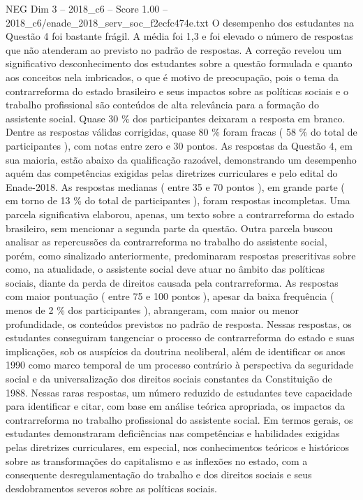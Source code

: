 \begin{textsample}{NEG Dim 3 – 2018\_c6 – Score 1.00 – 2018\_c6/enade\_2018\_serv\_soc\_f2ecfc474e.txt}
O desempenho dos estudantes na Questão 4 foi bastante frágil.
A média foi 1,3 e foi elevado o número de respostas que não atenderam ao previsto no padrão de respostas.
A correção revelou um significativo desconhecimento dos estudantes sobre a questão formulada e quanto aos conceitos nela imbricados, o que é motivo de preocupação, pois o tema da contrarreforma do estado brasileiro e seus impactos sobre as políticas sociais e o trabalho profissional são conteúdos de alta relevância para a formação do assistente social.
Quase 30 \% dos participantes deixaram a resposta em branco.
Dentre as respostas válidas corrigidas, quase 80 \% foram fracas ( 58 \% do total de participantes ), com notas entre zero e 30 pontos.
As respostas da Questão 4, em sua maioria, estão abaixo da qualificação razoável, demonstrando um desempenho aquém das competências exigidas pelas diretrizes curriculares e pelo edital do Enade-2018.
As respostas medianas ( entre 35 e 70 pontos ), em grande parte ( em torno de 13 \% do total de participantes ), foram respostas incompletas.
Uma parcela significativa elaborou, apenas, um texto sobre a contrarreforma do estado brasileiro, sem mencionar a segunda parte da questão.
Outra parcela buscou analisar as repercussões da contrarreforma no trabalho do assistente social, porém, como sinalizado anteriormente, predominaram respostas prescritivas sobre como, na atualidade, o assistente social deve atuar no âmbito das políticas sociais, diante da perda de direitos causada pela contrarreforma.
As respostas com maior pontuação ( entre 75 e 100 pontos ), apesar da baixa frequência ( menos de 2 \% dos participantes ), abrangeram, com maior ou menor profundidade, os conteúdos previstos no padrão de resposta.
Nessas respostas, os estudantes conseguiram tangenciar o processo de contrarreforma do estado e suas implicações, sob os auspícios da doutrina neoliberal, além de identificar os anos 1990 como marco temporal de um processo contrário à perspectiva da seguridade social e da universalização dos direitos sociais constantes da Constituição de 1988.
Nessas raras respostas, um número reduzido de estudantes teve capacidade para identificar e citar, com base em análise teórica apropriada, os impactos da contrarreforma no trabalho profissional do assistente social.
Em termos gerais, os estudantes demonstraram deficiências nas competências e habilidades exigidas pelas diretrizes curriculares, em especial, nos conhecimentos teóricos e históricos sobre as transformações do capitalismo e as inflexões no estado, com a consequente desregulamentação do trabalho e dos direitos sociais e seus desdobramentos severos sobre as políticas sociais.

\end{textsample}
